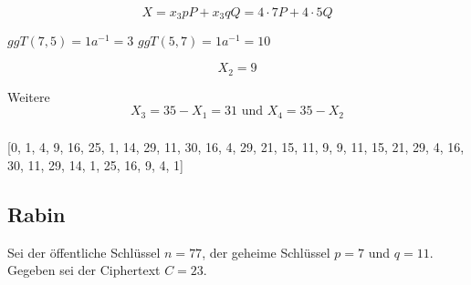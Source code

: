 \begin{equation}
	X = x_3 p P + x_3 q Q = 4 \cdot 7 P + 4 \cdot 5 Q
\end{equation}

$ggT(7,5)=1 a^{-1} = 3$
$ggT(5,7)=1 a^{-1} = 10$

\[	X_2 = 9\]

Weitere \[X_3 = 35-X_1 = 31 \text{ und } X_4 = 35-X_2 \]
 
\subsubsection{}
[0, 1, 4, 9, 16, 25, 1, 14, 29, 11, 30, 16, 4, 29, 21, 15, 11, 9, 9, 11, 15, 21, 29, 4, 16, 30, 11, 29, 14, 1, 25, 16, 9, 4, 1]

\subsection{Rabin}

Sei der öffentliche Schlüssel $n=77$, der geheime Schlüssel $p=7$ und $q=11$.
Gegeben sei der Ciphertext $C = 23$.
